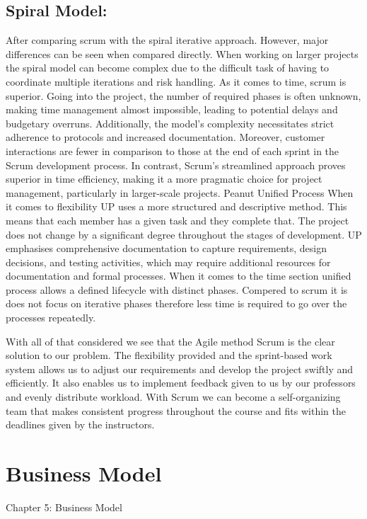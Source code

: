 \documentclass[12pt]{report}
\begin{document}
\subsection*{Spiral Model:} 
After comparing scrum with the spiral iterative approach. However, major differences can be seen when compared directly.  When working on larger projects the spiral model can become complex due to the difficult task of having to coordinate multiple iterations and risk handling.  As it comes to time, scrum is superior. Going into the project, the number of required phases is often unknown, making time management almost impossible, leading to potential delays and budgetary overruns. Additionally, the model's complexity necessitates strict adherence to protocols and increased documentation. Moreover, customer interactions are fewer in comparison to those at the end of each sprint in the Scrum development process. In contrast, Scrum's streamlined approach proves superior in time efficiency, making it a more pragmatic choice for project management, particularly in larger-scale projects.
Peanut
Unified Process
When it comes to flexibility UP uses a more structured and descriptive method. This means that each member has a given task and they complete that. The project does not change by a significant degree throughout the stages of development. UP emphasises comprehensive documentation to capture requirements, design decisions, and testing activities, which may require additional resources for documentation and formal processes.
When it comes to the time section unified process allows a defined lifecycle with distinct phases. Compered to scrum it is does not focus on iterative phases therefore less time is required to go over the processes repeatedly.

With all of that considered we see that the Agile method Scrum is the clear solution to our problem. The flexibility provided and the sprint-based work system allows us to adjust our requirements and develop the project swiftly and efficiently. It also enables us to implement feedback given to us by our professors and evenly distribute workload. With Scrum we can become a self-organizing team that makes consistent progress throughout the course and fits within the deadlines given by the instructors. 


\section{Business Model}
Chapter 5: Business Model 
\end{document}
